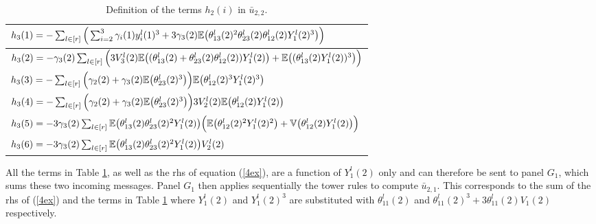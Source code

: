\begin{table}
\renewcommand{\arraystretch}{2}
\begin{center}
\begin{tabular}{|l|}
\hline
$h_3(1)=-\sum_{l\in[r]}\Big(\sum_{i=2}^3\gamma_i(1)y_i^l(1)^3+3\gamma_3(2)\mathbb{E}\big(\theta_{13}^l(2)^2\theta_{23}^l(2)\theta_{12}^l(2)Y_1^l(2)^3\big)\Big)$\\
\hline
$h_3(2)=-\gamma_3(2)\sum_{l\in[r]}\Big(3V_3^l(2)\mathbb{E}\big((\theta_{13}^l(2)+\theta_{23}^l(2)\theta_{12}^l(2))Y_1^l(2)\big)+\mathbb{E}\big( (\theta_{13}^l(2)Y_1^l(2))^3\big)\Big)$\\
\hline
$
h_3(3)=-\sum_{l\in[r]}\Big(\gamma_2(2)+\gamma_3(2)\mathbb{E}\big(\theta_{23}^l(2)^3\big)\Big)\mathbb{E}\big(\theta_{12}^l(2)^3Y_1^l(2)^3\big)$\\
\hline
$h_3(4)=-\sum_{l\in[r]}\Big(\gamma_2(2)+\gamma_3(2)\mathbb{E}\big(\theta_{23}^l(2)^3\big)\Big)3V_2^l(2)\mathbb{E}\big(\theta_{12}^l(2)Y_1^l(2)\big)$\\
\hline
$h_3(5)=-3\gamma_3(2)\sum_{l\in[r]}\mathbb{E}\big(\theta_{13}^l(2)\theta_{23}^l(2)^2Y_1^l(2)\big)\Big(\mathbb{E}\big(\theta_{12}^l(2)^2Y_1^l(2)^2\big)+\mathbb{V}\big(\theta_{12}^l(2)Y_1^l(2)\big)\Big)$\\
\hline
$h_3(6)=-3\gamma_3(2)\sum_{l\in[r]}\mathbb{E}\big(\theta_{13}^l(2)\theta_{23}^l(2)^2Y_1^l(2)\big)V_2^l(2)$\\
\hline
\end{tabular}
\end{center}
\caption{Definition of the terms $h_2(i)$ in $\bar{u}_{2,2}$.\label{pr}}
\end{table}

All the terms in Table \ref{pr}, as well as the rhs of equation (\ref{4ex}), are a function of $Y_1^l(2)$ only and can therefore be  sent to panel $G_1$, which sums these two incoming messages. Panel $G_1$ then applies sequentially the tower rules to compute $\bar{u}_{2,1}$. This corresponds to the sum of the rhs of (\ref{4ex}) and the terms in Table \ref{pr} where $Y_1^l(2)$ and $Y_1^l(2)^3$ are substituted with $\theta_{11}^l(2)$ and $\theta_{11}^l(2)^3+3\theta_{11}^l(2)V_1(2)$ respectively.

